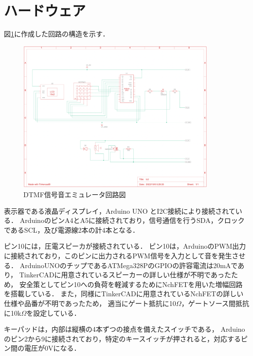 \documentclass[dvipdfmx,titlepage,a4j]{jsarticle}  %
\begin{document}
\section{ハードウェア}
図\ref{fig:cir.png}に作成した回路の構造を示す．
\begin{figure}[H]
  \centering
  \includegraphics[width=10cm]{../fig/cir.png}
  \caption{DTMF信号音エミュレータ回路図}
  \label{fig:cir.png}
\end{figure}
表示器である液晶ディスプレイ，Arduino UNO とI2C接続により接続されている．
ArduinoのピンA4とA5に接続されており，信号通信を行うSDA，クロックであるSCL，及び電源線2本の計4本となる．

ピン10には，圧電スピーカが接続されている．
ピン10は，ArduinoのPWM出力に接続されており，このピンに出力されるPWM信号を入力として音を発生させる．
ArduinoUNOのチップであるATMega328PのGPIOの許容電流は20mAであり，
TinkerCADに用意されているスピーカーの詳しい仕様が不明であったため，
安全策としてピン10への負荷を軽減するためにNchFETを用いた増幅回路を搭載している．
また，同様にTinkerCADに用意されているNchFETの詳しい仕様や品番が不明であったため，
適当にゲート抵抗に10$\Omega$，ゲートソース間抵抗に10k$\Omega$を設定している．

キーパッドは，内部は縦横の4本ずつの接点を備えたスイッチである，
Arduinoのピン2から9に接続されており，特定のキースイッチが押されると，対応するピン間の電圧が0Vになる．
\end{document}
